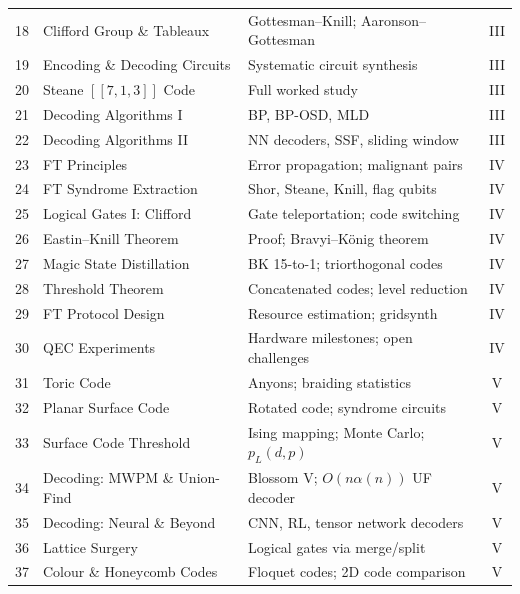 \documentclass[12pt,oneside]{article}
\begin{document}
{\begin{longtable}{@{}cll c@{}}
  18 & Clifford Group \& Tableaux      & Gottesman--Knill; Aaronson--Gottesman   & III \\
  19 & Encoding \& Decoding Circuits   & Systematic circuit synthesis            & III \\
  20 & Steane $[[7,1,3]]$ Code         & Full worked study                       & III \\
  21 & Decoding Algorithms I           & BP, BP-OSD, MLD                         & III \\
  22 & Decoding Algorithms II          & NN decoders, SSF, sliding window        & III \\
  \midrule
  23 & FT Principles                   & Error propagation; malignant pairs      & IV \\
  24 & FT Syndrome Extraction          & Shor, Steane, Knill, flag qubits        & IV \\
  25 & Logical Gates I: Clifford       & Gate teleportation; code switching      & IV \\
  26 & Eastin--Knill Theorem           & Proof; Bravyi--König theorem            & IV \\
  27 & Magic State Distillation        & BK 15-to-1; triorthogonal codes         & IV \\
  28 & Threshold Theorem               & Concatenated codes; level reduction     & IV \\
  29 & FT Protocol Design              & Resource estimation; gridsynth          & IV \\
  30 & QEC Experiments                 & Hardware milestones; open challenges    & IV \\
  \midrule
  31 & Toric Code                      & Anyons; braiding statistics             & V \\
  32 & Planar Surface Code             & Rotated code; syndrome circuits         & V \\
  33 & Surface Code Threshold          & Ising mapping; Monte Carlo; $p_L(d,p)$  & V \\
  34 & Decoding: MWPM \& Union-Find    & Blossom V; $O(n\alpha(n))$ UF decoder   & V \\
  35 & Decoding: Neural \& Beyond      & CNN, RL, tensor network decoders        & V \\
  36 & Lattice Surgery                 & Logical gates via merge/split           & V \\
  37 & Colour \& Honeycomb Codes       & Floquet codes; 2D code comparison       & V \\

\end{longtable}}
\end{document}
